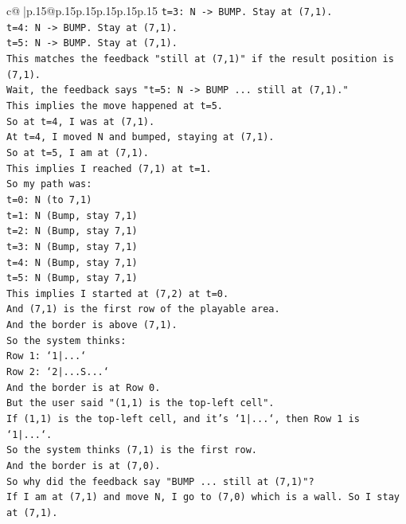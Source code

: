 \documentclass{article}
\begin{document}
{\begin{supertabular}{c@{$\;$}|p{.15\linewidth}@{}p{.15\linewidth}p{.15\linewidth}p{.15\linewidth}p{.15\linewidth}p{.15\linewidth}}
{{{\texttt{t=3: N {-}> BUMP. Stay at (7,1).} \\
\texttt{t=4: N {-}> BUMP. Stay at (7,1).} \\
\texttt{t=5: N {-}> BUMP. Stay at (7,1).} \\
\texttt{This matches the feedback "still at (7,1)" if the result position is (7,1).} \\
\texttt{Wait, the feedback says "t=5: N {-}> BUMP ... still at (7,1)."} \\
\texttt{This implies the move happened at t=5.} \\
\texttt{So at t=4, I was at (7,1).} \\
\texttt{At t=4, I moved N and bumped, staying at (7,1).} \\
\texttt{So at t=5, I am at (7,1).} \\
\texttt{This implies I reached (7,1) at t=1.} \\
\texttt{So my path was:} \\
\texttt{t=0: N (to 7,1)} \\
\texttt{t=1: N (Bump, stay 7,1)} \\
\texttt{t=2: N (Bump, stay 7,1)} \\
\texttt{t=3: N (Bump, stay 7,1)} \\
\texttt{t=4: N (Bump, stay 7,1)} \\
\texttt{t=5: N (Bump, stay 7,1)} \\
\texttt{This implies I started at (7,2) at t=0.} \\
\texttt{And (7,1) is the first row of the playable area.} \\
\texttt{And the border is above (7,1).} \\
\texttt{So the system thinks:} \\
\texttt{Row 1: `1|...`} \\
\texttt{Row 2: `2|...S...`} \\
\texttt{And the border is at Row 0.} \\
\texttt{But the user said "(1,1) is the top{-}left cell".} \\
\texttt{If (1,1) is the top{-}left cell, and it's `1|...`, then Row 1 is `1|...`.} \\
\texttt{So the system thinks (7,1) is the first row.} \\
\texttt{And the border is at (7,0).} \\
\texttt{So why did the feedback say "BUMP ... still at (7,1)"?} \\
\texttt{If I am at (7,1) and move N, I go to (7,0) which is a wall. So I stay at (7,1).} \\
}}}
\end{supertabular}}
\end{document}
